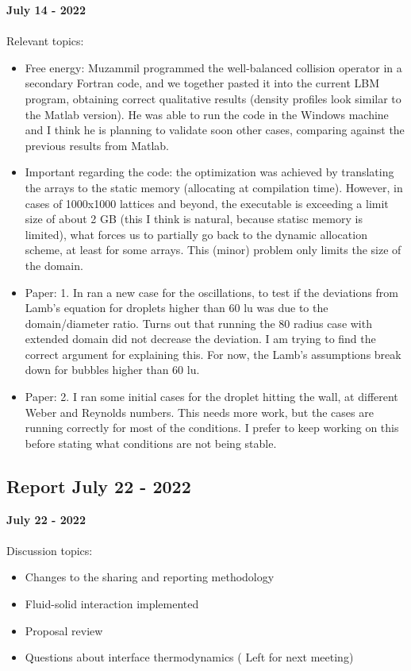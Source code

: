 \documentclass[8pt]{beamer}
\begin{document}
	\begin{frame}{}
		\textbf{July 14 - 2022}\\~\\
		Relevant topics:
		\begin{itemize}
			\item Free energy: Muzammil programmed the well-balanced collision operator in a secondary Fortran code, and we together pasted it into the current LBM program, obtaining correct qualitative results (density profiles look similar to the Matlab version). He was able to run the code in the Windows machine and I think he is planning to validate soon other cases, comparing against the previous results from Matlab.
			
			\item Important regarding the code: the optimization was achieved by translating the arrays to the static memory (allocating at compilation time). However, in cases of 1000x1000 lattices and beyond, the executable is exceeding a limit size of about 2 GB (this I think is natural, because statisc memory is limited), what forces us to partially go back to the dynamic allocation scheme, at least for some arrays. This (minor) problem only limits the size of the domain.
			
			\item Paper: 1. In ran a new case for the oscillations, to test if the deviations from Lamb's equation for droplets higher than 60 lu was due to the domain/diameter ratio. Turns out that running the 80 radius case with extended domain did not decrease the deviation. I am trying to find the correct argument for explaining this. For now, the Lamb's assumptions break down for bubbles higher than 60 lu.
			
			\item Paper: 2. I ran some initial cases for the droplet hitting the wall, at different Weber and Reynolds numbers. This needs more work, but the cases are running correctly for most of the conditions. I prefer to keep working on this before stating what conditions are not being stable. 
		\end{itemize}
	\end{frame}

	\subsection{Report July 22 - 2022}
	\label{}
	\justifying
	\begin{frame}{}
		\textbf{July 22 - 2022}\\~\\
		Discussion topics:
		\begin{itemize}
			\item Changes to the sharing and reporting methodology
			\item Fluid-solid interaction implemented
			\item Proposal review
			\item Questions about interface thermodynamics ({\color{red} Left for next meeting})
		\end{itemize}
	\end{frame}
\end{document}
